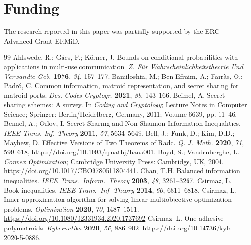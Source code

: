 \documentclass[reqno]{amsart}
\theoremstyle{definition}
\begin{document}
\section*{Funding}

The research reported in this paper was partially supported by the ERC
Advanced Grant ERMiD.


\begin{thebibliography}{99}
\setlength\itemsep{1pt plus 3pt minus 2pt}
%
 Ahlswede, R.; G\'acs, P.; K\"orner, J.
  Bounds on conditional probabilities with applications in multi-use
  communication.
  \emph{Z. F\"ur Wahrscheinlichkeitstheorie Und Verwandte Geb.} \textbf{1976},
  {\emph{34}}, 157--177.
%
 Bamiloshin, M.; Ben{-}Efraim, A.; Farr{\`{a}}s, O.; Padr{\'{o}}, C.
  Common information, matroid representation, and secret sharing for
               matroid ports.
  \newblock\emph{Des. Codes Cryptogr.} \textbf{2021}, \emph{89}, 143--166.
%
 Beimel, A.
  Secret-sharing schemes: A survey.
  \newblock In \emph{Coding and Cryptology}; Lecture Notes in Computer 
  Science; Springer: Berlin/Heidelberg, Germany,  2011; Volume 6639, pp. 11--46.
%
 Beimel, A.; Orlov, I.
  Secret Sharing and Non-Shannon Information Inequalities.
  \emph{IEEE Trans. Inf. Theory} {\bf 2011}, \emph{57}, 5634--5649.
%
 Bell, J.; Funk, D.; Kim, D.D.; Mayhew, D.
  Effective Versions of Two Theorems of Rado.
  \emph{Q. J. Math.}  \textbf{2020}, {\emph{71}}, 599--618,
  \url{https://doi.org/10.1093/qmathj/haaa001}.
%
 Boyd, S.; Vandenberghe, L.
  \emph{Convex Optimization};
   Cambridge University Press: Cambridge, UK, 2004.
  \url{https://doi.org/10.1017/CBO9780511804441}.
%
 Chan, T.H.
  Balanced information inequalities.
  \emph{IEEE Trans.\ Inform.\ Theory} \textbf{2003},  \emph{49}, 3261--3267.
%
 Csirmaz, L.
  {Book inequalities}.
  \emph{IEEE Trans.\ Inf. Theory} \textbf{2014}, {\emph{60}}, 6811--6818.
%
 Csirmaz, L.
  Inner approximation algorithm for solving linear multiobjective optimization
  problems.
  \emph{Optimization} \textbf{2020}, {\emph{70}}, 1487--1511.
  \url{https://doi.org/10.1080/02331934.2020.1737692}
%
 Csirmaz, L. 
   One-adhesive polymatroids.
  \emph{Kybernetika} \textbf{2020}, \emph{56}, 886--902.
  \url{https://doi.org/10.14736/kyb-2020-5-0886}.

\end{thebibliography}
\end{document}
